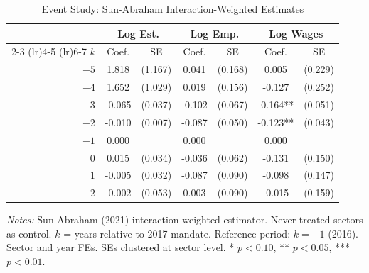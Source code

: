 \begin{table}[htbp]
\centering
\caption{Event Study: Sun-Abraham Interaction-Weighted Estimates}
\label{tab:eventstudy}
\begin{tabular}{rcccccc}
\toprule
 & \multicolumn{2}{c}{Log Est.} & \multicolumn{2}{c}{Log Emp.} & \multicolumn{2}{c}{Log Wages} \\
\cmidrule(lr){2-3} \cmidrule(lr){4-5} \cmidrule(lr){6-7}
$k$ & Coef. & SE & Coef. & SE & Coef. & SE \\
\midrule
$-5$ & 1.818 & (1.167) & 0.041 & (0.168) & 0.005 & (0.229) \\
$-4$ & 1.652 & (1.029) & 0.019 & (0.156) & -0.127 & (0.252) \\
$-3$ & -0.065 & (0.037) & -0.102 & (0.067) & -0.164** & (0.051) \\
$-2$ & -0.010 & (0.007) & -0.087 & (0.050) & -0.123** & (0.043) \\
$-1$ & 0.000 & & 0.000 & & 0.000 & \\
$0$ & 0.015 & (0.034) & -0.036 & (0.062) & -0.131 & (0.150) \\
$1$ & -0.005 & (0.032) & -0.087 & (0.090) & -0.098 & (0.147) \\
$2$ & -0.002 & (0.053) & 0.003 & (0.090) & -0.015 & (0.159) \\
\bottomrule
\end{tabular}
\begin{minipage}{\textwidth}
\vspace{0.5em}
\footnotesize
\textit{Notes:} Sun-Abraham (2021) interaction-weighted estimator. Never-treated sectors as control. $k$ = years relative to 2017 mandate. Reference period: $k = -1$ (2016). Sector and year FEs. SEs clustered at sector level. * $p<0.10$, ** $p<0.05$, *** $p<0.01$.
\end{minipage}
\end{table}
